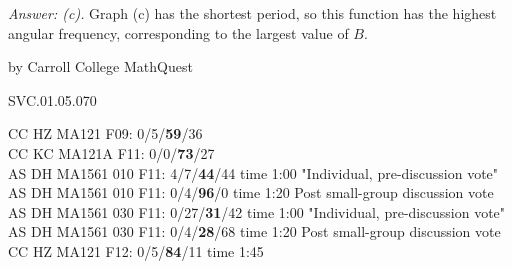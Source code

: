 {\it Answer: (c).} Graph (c) has the shortest period, so this function has the highest angular frequency, corresponding to the largest value of $B$.

\medskip

by Carroll College MathQuest

SVC.01.05.070

CC HZ MA121 F09: 0/5/{\bf59}/36  \\
CC KC MA121A F11: 0/0/{\bf73}/27  \\
AS DH MA1561 010 F11: 4/7/{\bf44}/44 time 1:00 "Individual, pre-discussion vote" \\
AS DH MA1561 010 F11: 0/4/{\bf96}/0 time 1:20 Post small-group discussion vote \\
AS DH MA1561 030 F11: 0/27/{\bf31}/42 time 1:00 "Individual, pre-discussion vote" \\
AS DH MA1561 030 F11: 0/4/{\bf28}/68 time 1:20 Post small-group discussion vote \\
CC HZ MA121 F12: 0/5/{\bf84}/11 time 1:45  \\
